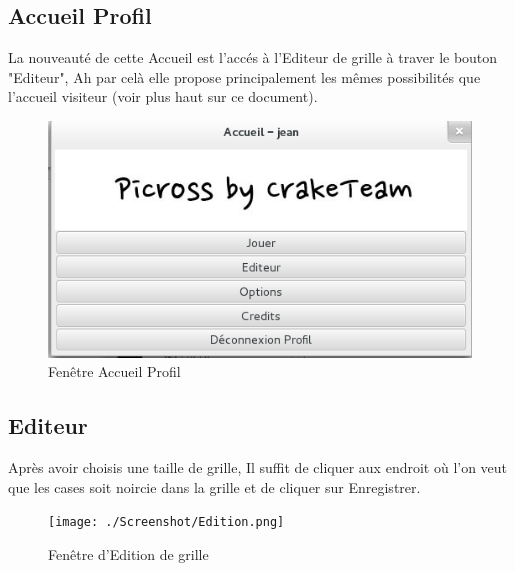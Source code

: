 \documentclass[11pt]{article}
\begin{document}
\subsection{Accueil Profil}

La nouveauté de cette Accueil est l'accés à l'Editeur de grille à traver le bouton "Editeur", Ah par celà elle propose principalement les mêmes possibilités que l'accueil visiteur (voir plus haut sur ce document).

	\begin{figure}[!ht]
		\centering
		\includegraphics{./Screenshot/AccueilProfil.png}
		\caption{Fenêtre Accueil Profil}
	\end{figure}


\subsection{Editeur}

Après avoir choisis une taille de grille, Il suffit de cliquer aux endroit où l'on veut que les cases soit noircie dans la grille et de cliquer sur Enregistrer.

	\begin{figure}[!ht]
		\centering
		\texttt{[image: ./Screenshot/Edition.png]}
		\caption{Fenêtre d'Edition de grille}
	\end{figure}
\end{document}
